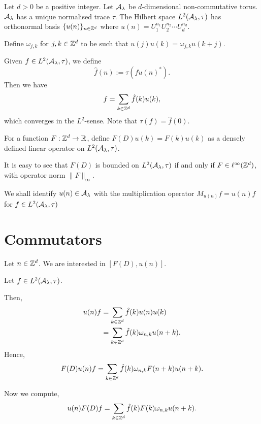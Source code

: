Let $d > 0$ be a positive integer. 
Let $\mathcal{A}_{\lambda}$ be $d$-dimensional non-commutative torus.
$\mathcal{A}_\lambda$ has a unique normalised trace $\tau$.
The Hilbert space $L^2(\mathcal{A}_\lambda,\tau)$ 
has orthonormal basis $\{u(n)\}_{n \in \mathbb{Z}^d}$ where $u(n) = U_1^{n_1}U_2^{n_2}\cdots U_d^{n_d}$.

Define $\omega_{j,k}$ for $j,k \in \mathbb{Z}^d$ to be such
that $u(j)u(k) = \omega_{j,k}u(k+j)$.

Given $f \in L^2(\mathcal{A}_\lambda,\tau)$, we define
\begin{equation}
    \hat{f}(n) := \tau(fu(n)^*).
\end{equation}
Then we have
\begin{equation}
    f = \sum_{k \in \mathbb{Z}^d} \hat{f}(k)u(k),
\end{equation}
which converges in the $L^2$-sense. Note that $\tau(f) = \hat{f}(0)$.

For a function $F:\mathbb{Z}^d\rightarrow \mathbb{R}$, define $F(D) u(k) = F(k)u(k)$
as a densely defined linear operator on $L^2(\mathcal{A}_\lambda,\tau)$. 

It is easy to see that $F(D)$ is bounded on $L^2(\mathcal{A}_\lambda,\tau)$
if and only if $F \in \ell^\infty(\mathbb{Z}^d)$, with operator norm
$\|F\|_\infty$.

We shall identify $u(n) \in \mathcal{A}_\lambda$ with the multiplication operator
$M_{u(n)}f = u(n)f$ for $f \in L^2(\mathcal{A}_\lambda,\tau)$

\section{Commutators}
\label{commutators}
Let $n \in \mathbb{Z}^d$. We are interested in $[F(D),u(n)]$. 

Let $f \in L^2(\mathcal{A}_\lambda,\tau)$. 

Then,
\begin{align}
    u(n)f &= \sum_{k \in \mathbb{Z}^d} \hat{f}(k)u(n)u(k)\\
          &= \sum_{k \in \mathbb{Z}^d} \hat{f}(k)\omega_{n,k} u(n+k).
\end{align}
Hence,
\begin{equation}
    F(D) u(n)f = \sum_{k \in \mathbb{Z}^d} \hat{f}(k) \omega_{n,k} F(n+k) u(n+k).
\end{equation}

Now we compute,
\begin{equation}
    u(n)F(D)f = \sum_{k \in \mathbb{Z}^d} \hat{f}(k) F(k) \omega_{n,k} u(n+k).
\end{equation}

